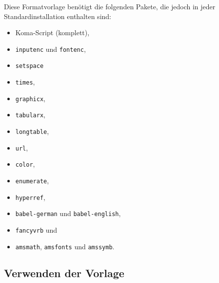\documentclass[plainarticle,zihtitle,german,final,hyperref,utf8]{zihpub}
\begin{document}
Diese Formatvorlage ben\"otigt die folgenden Pakete, die jedoch in jeder Standardinstallation enthalten sind:
\begin{itemize}
	\item  Koma-Script (komplett),
	\item \texttt{inputenc} und \texttt{fontenc},
	\item \texttt{setspace}
	\item \texttt{times},
	\item \texttt{graphicx},
	\item \texttt{tabularx},
	\item \texttt{longtable},
	\item \texttt{url},
	\item \texttt{color},
	\item \texttt{enumerate},
	\item \texttt{hyperref},
    	\item \texttt{babel-german} und \texttt{babel-english},
	\item \texttt{fancyvrb} und
	\item \texttt{amsmath}, \texttt{amsfonts} und \texttt{amssymb}.
\end{itemize}

\subsection{Verwenden der Vorlage}
\end{document}
